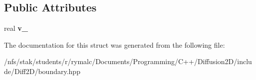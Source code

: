 \subsection*{Public Attributes}
\begin{DoxyCompactItemize}
\item 
\hypertarget{structboundary__single_a3aef38455e276f44418ae1c34803cce1}{real {\bfseries v\+\_\+}}\label{structboundary__single_a3aef38455e276f44418ae1c34803cce1}

\end{DoxyCompactItemize}


The documentation for this struct was generated from the following file\+:\begin{DoxyCompactItemize}
\item 
/nfs/stak/students/r/rymalc/\+Documents/\+Programming/\+C++/\+Diffusion2\+D/include/\+Diff2\+D/boundary.\+hpp\end{DoxyCompactItemize}
